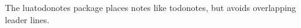 \documentclass[11pt]{article}\usepackage[paperwidth=14cm,paperheight=7cm,left=1cm,right=3.6cm,top=1cm,bottom=1cm,marginparwidth=2.6cm,marginparsep=3mm]{geometry}\pagestyle{empty}
\begin{document}
The luatodonotes package places notes like todonotes, but avoids overlapping leader lines.
\end{document}
